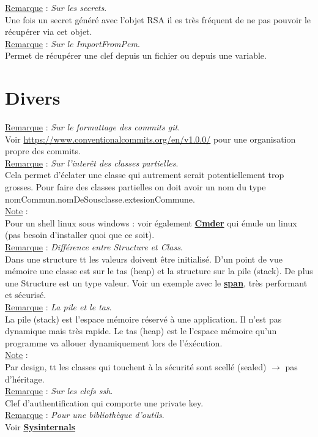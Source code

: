 \documentclass[a4paper,12pt,twoside]{article}
\newcommand{\urlcolor}{magenta}  %
\newcommand{\keycolor}{purple} %
\newcommand{\rem}[2]{\noindent\underline{Remarque} : \textit{#1}.\\ \indent #2}
\newcommand{\note}[1]{\noindent\underline{Note} : \\ \indent #1}
\newcommand{\keyref}[2]{\hypersetup{urlcolor=\keycolor} \href{#1}{\textbf{#2}}\hypersetup{urlcolor=\urlcolor}}
\begin{document}
{{\rem{Sur les secrets}{Une fois un secret généré avec l'objet RSA il es très fréquent de ne pas pouvoir le récupérer via cet objet.}\\

\rem{Sur le ImportFromPem}{Permet de récupérer une clef depuis un fichier ou depuis une variable.}\\

\section{Divers}

\rem{Sur le formattage des commits git}{Voir \url{https://www.conventionalcommits.org/en/v1.0.0/} pour une organisation propre des commits.}\\

\rem{Sur l'interêt des classes partielles}{Cela permet d'éclater une classe qui autrement serait potentiellement trop grosses. Pour faire des classes partielles on doit avoir un nom du type nomCommun.nomDeSousclasse.extesionCommune.}\\

\note{Pour un shell linux sous windows : voir également \keyref{https://cmder.net/}{Cmder} qui émule un linux (pas besoin d'installer quoi que ce soit).}\\

\rem{Différence entre Structure et Class}{Dans une structure tt les valeurs doivent être initialisé. D'un point de vue mémoire une classe est sur le tas (heap) et la structure sur la pile (stack). De plus une Structure est un type valeur. Voir un exemple avec le \keyref{https://docs.microsoft.com/en-us/dotnet/api/system.span-1?view=net-6.0}{span}, très performant et sécurisé.}\\

\rem{La pile et le tas}{La pile (stack) est l'espace mémoire réservé à une application. Il n'est pas dynamique mais très rapide. Le tas (heap) est le l'espace mémoire qu'un programme va allouer dynamiquement lors de l'éxécution.}\\

\note{Par design, tt les classes qui touchent à la sécurité sont scellé (sealed) $\to$ pas d'héritage.}\\

\rem{Sur les clefs ssh}{Clef d'authentification qui comporte une private key.}\\

\rem{Pour une bibliothèque d'outils}{Voir \keyref{https://docs.microsoft.com/en-us/sysinternals/}{Sysinternals}}\\

}}
\end{document}
